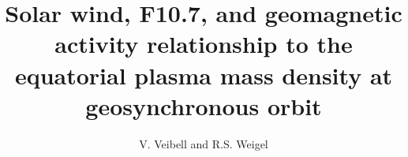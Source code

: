 \documentclass[12pt]{article}
\begin{document}
\title{Solar wind, F10.7, and geomagnetic activity relationship to the equatorial plasma mass density at geosynchronous orbit}
\author{V. Veibell and R.S. Weigel}
\doublespacing
\maketitle






\end{document}
